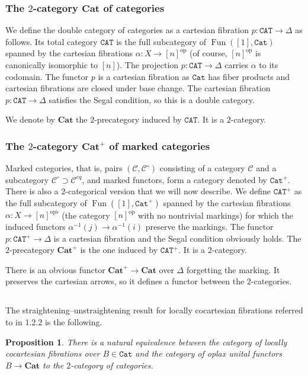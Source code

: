 \documentclass[12pt]{amsart}%
\newtheorem{prp}[subsubsection]{Proposition}
\newcommand{\Cat}{\mathtt{Cat}}
\newcommand{\bfCat}{\mathbf{Cat}}
\newcommand{\CAT}{\mathtt{CAT}}
\newcommand{\eq}{\mathit{eq}}
\newcommand{\Fun}{\operatorname{Fun}}
\newcommand{\op}{\mathrm{op}}
\newcommand{\cC}{\mathcal{C}}
\begin{document}
\subsubsection{The $2$-category $\bfCat$ of categories}
\label{sss:cat}
We define the double category of categories as a cartesian fibration
$p:\CAT\to\Delta$ as follows. Its total category $\CAT$ is the full subcategory of $\Fun([1],\Cat)$ spanned by the cartesian fibrations
$\alpha:X\to [n]^\op$
(of course, $[n]^\op$ is canonically isomorphic to $[n]$). The projection
$p:\CAT\to\Delta$ carries $\alpha$ to its codomain. The functor $p$
is a cartesian fibration as $\Cat$ has fiber products and cartesian fibrations are closed under base change.  The cartesian fibration
$p:\CAT\to\Delta$ satisfies the Segal condition, so this is a double category.

We denote by $\bfCat$ the $2$-precategory induced by $\CAT$. It is a 
$2$-category.  



\subsubsection{The $2$-category $\bfCat^+$ of marked categories}

Marked categories, that is, pairs $(\cC,\cC^\circ)$ consisting of a category $\cC$ and a subcategory $\cC^\circ\supset\cC^\eq$, and marked functors, form a category denoted by $\Cat^+$.
There is also a $2$-categorical version that we will now describe.
We define $\CAT^+$ as the full subcategory of $\Fun([1],\Cat^+)$ spanned by the cartesian fibrations
$\alpha:X\to  [n]^{\op\flat}$ (the category $[n]^\op$ with no nontrivial markings)  for which the induced functors $\alpha^{-1}(j)\to \alpha^{-1}(i)$ preserve the markings. The functor $p:\CAT^+\to\Delta$
is a cartesian fibration and the Segal condition obviously holds.
The $2$-precategory $\bfCat^+$ is the one induced by 
$\CAT^+$. It is a $2$-category.  

There is an obvious functor $\bfCat^+\to\bfCat$ over $\Delta$ forgetting the marking. It preserves the cartesian arrows, so it defines a functor between the $2$-categories.

\subsection{}
The straightening--unstraightening result for 
 locally cocartesian fibrations referred to in 1.2.2 is the following.

\begin{prp}
\label{prp:lccf}
There is a natural equivalence between the category of locally cocartesian 
fibrations over $B\in\Cat$ and the category of oplax unital functors $B\to\bfCat$ to the $2$-category of categories. 
\end{prp}
\end{document}
